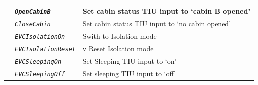 \documentclass{template/openetcs}
\begin{document}
\begin{itemize}
\begin{longtable}{|l|l|l|}
			\hline
			
			&	\begin{minipage}[t]{0.40\linewidth} \emph{\texttt{OpenCabinB}} \end{minipage}
			&	\begin{minipage}[t]{0.38\linewidth} Set cabin status TIU input to ‘cabin B opened’ \end{minipage} \\
			
			\hline
			
			&	\begin{minipage}[t]{0.40\linewidth} \emph{\texttt{CloseCabin}} \end{minipage}
			&	\begin{minipage}[t]{0.38\linewidth} Set cabin status TIU input to ‘no cabin opened’ \end{minipage} \\
			
			\hline
			
			&	\begin{minipage}[t]{0.40\linewidth} \emph{\texttt{EVCIsolationOn}} \end{minipage}
			&	\begin{minipage}[t]{0.38\linewidth} Swith to Isolation mode \end{minipage} \\
			
			\hline
			
			&	\begin{minipage}[t]{0.40\linewidth} \emph{\texttt{EVCIsolationReset}} \end{minipage}
			&	\begin{minipage}[t]{0.38\linewidth}v Reset Isolation mode \end{minipage} \\
			
			\hline
			
			&	\begin{minipage}[t]{0.40\linewidth} \emph{\texttt{EVCSleepingOn}} \end{minipage}
			&	\begin{minipage}[t]{0.38\linewidth} Set Sleeping TIU input to ‘on’ \end{minipage} \\
			
			\hline
			
			&	\begin{minipage}[t]{0.40\linewidth} \emph{\texttt{EVCSleepingOff}} \end{minipage}
			&	\begin{minipage}[t]{0.38\linewidth} Set sleeping TIU input to ‘off’\end{minipage} \\
			

\end{longtable}
\end{itemize}
\end{document}

